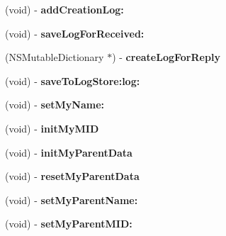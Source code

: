 \begin{DoxyCompactItemize}
\item 
\hypertarget{interface_messenger_system_aa4f4f9dbed2ccb22b30fa3bc86229560}{
(void) -\/ {\bfseries addCreationLog:}}
\label{dc/dc9/interface_messenger_system_aa4f4f9dbed2ccb22b30fa3bc86229560}

\item 
\hypertarget{interface_messenger_system_aea64a6b2e2486edb5a3443a23d13934f}{
(void) -\/ {\bfseries saveLogForReceived:}}
\label{dc/dc9/interface_messenger_system_aea64a6b2e2486edb5a3443a23d13934f}

\item 
\hypertarget{interface_messenger_system_a51d6be48e11ee01ba98c720b46ae398e}{
(NSMutableDictionary $\ast$) -\/ {\bfseries createLogForReply}}
\label{dc/dc9/interface_messenger_system_a51d6be48e11ee01ba98c720b46ae398e}

\item 
\hypertarget{interface_messenger_system_a04b3995de0fb3486ee1f64bc8868b8f3}{
(void) -\/ {\bfseries saveToLogStore:log:}}
\label{dc/dc9/interface_messenger_system_a04b3995de0fb3486ee1f64bc8868b8f3}

\item 
\hypertarget{interface_messenger_system_a0388f0bc3b5d73f8404fb65ae9f2478d}{
(void) -\/ {\bfseries setMyName:}}
\label{dc/dc9/interface_messenger_system_a0388f0bc3b5d73f8404fb65ae9f2478d}

\item 
\hypertarget{interface_messenger_system_adac10123acd489108d70a63d1b42669c}{
(void) -\/ {\bfseries initMyMID}}
\label{dc/dc9/interface_messenger_system_adac10123acd489108d70a63d1b42669c}

\item 
\hypertarget{interface_messenger_system_ae32a19a0477498f6b079551dfa08a15e}{
(void) -\/ {\bfseries initMyParentData}}
\label{dc/dc9/interface_messenger_system_ae32a19a0477498f6b079551dfa08a15e}

\item 
\hypertarget{interface_messenger_system_a111b446c0453facea8fc35774323dae7}{
(void) -\/ {\bfseries resetMyParentData}}
\label{dc/dc9/interface_messenger_system_a111b446c0453facea8fc35774323dae7}

\item 
\hypertarget{interface_messenger_system_a77cb388881cfe26e1b6440a1409c7c23}{
(void) -\/ {\bfseries setMyParentName:}}
\label{dc/dc9/interface_messenger_system_a77cb388881cfe26e1b6440a1409c7c23}

\item 
\hypertarget{interface_messenger_system_a4b835de059160b6e22eadd4035769c04}{
(void) -\/ {\bfseries setMyParentMID:}}
\label{dc/dc9/interface_messenger_system_a4b835de059160b6e22eadd4035769c04}

\end{DoxyCompactItemize}
